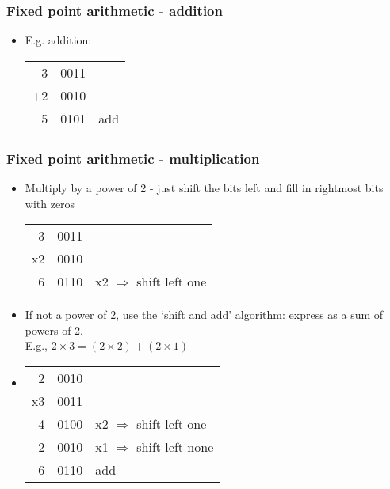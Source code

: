 \documentclass[11pt,a4paper]{article}
\newcommand{\bc}{\begin{center}}
\newcommand{\ec}{\end{center}}
\begin{document}
\begin{frame}[fragile]
	\frametitle{Fixed point arithmetic - addition}

	\begin{itemize}
	    \item E.g. addition:
	    \bc
	    \begin{tabular}{rrl}
	        3  & 0011 &\\
	        +2 & 0010 &\\
	        \cline{1-2}
	        5  & 0101 & add
	    \end{tabular}
	    \ec
	\end{itemize}

\end{frame}

\begin{frame}[fragile]
	\frametitle{Fixed point arithmetic - multiplication}

	\begin{itemize}
	    \item Multiply by a power of 2 - just shift the bits left and fill in rightmost bits with zeros
	    \bc
	    \begin{tabular}{rrl}
	        3  & 0011 &\\
	        x2 & 0010 &\\
	        \cline{1-2}
	        6  & 0110 & x2 $\Rightarrow$ shift left one
	    \end{tabular}
	    \ec
	    \item <2-> If not a power of 2, use the `shift and add' algorithm: express as a sum of powers of 2.\\
			E.g., $2\times3 = (2\times2) + (2\times1)$
	    \item <3-> \bc
	    \begin{tabular}{rrl}
	        2  & 0010 &\\
	        x3 & 0011 &\\
	        \cline{1-2}
					4 & 0100 & x2 $\Rightarrow$ shift left one\\
					2 & 0010 & x1 $\Rightarrow$ shift left none\\
	        \cline{1-2}
	        6  & 0110 & add
	    \end{tabular}
	    \ec
	\end{itemize}

\end{frame}
\end{document}
